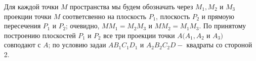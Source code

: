\begin{multicols}{2}
Для каждой точки $M$ пространства мы будем обозначать через $M_1,M_2$ и $M_3$ проекции точки $M$ соответсвенно на плоскость $P_1$, плоскость $P_2$ и прямоую пересечения $P_1$ и $P_2$; очевидно, 
$MM_1=M_2M_3$ и $MM_2=M_1M_3$. По принятому построению плоскостей $P_1$ и $P_2$ все три проекции точки $A(A_1, A_2$ и $A_3)$ совподают с $A$; по условию задаи $AB_1C_1D_1$ и $A_2B_2C_2D-$
квадраты со стороной 2.

\end{multicols}
